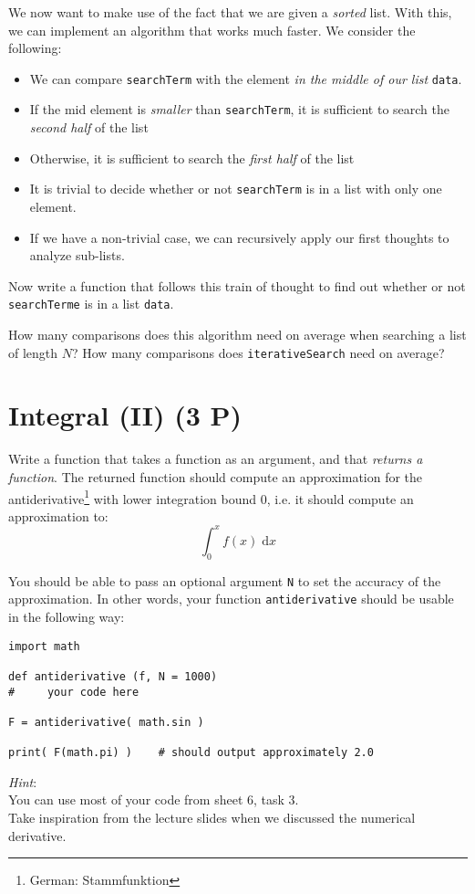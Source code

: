 \documentclass[
	ngerman,
	fontsize=10pt,
	parskip=half,
	titlepage=true,
	DIV=12
]{scrartcl}
\newcommand*{\ie}{i.\;e. }
\begin{document}
We now want to make use of the fact that we are given a \emph{sorted} list. With this, we can implement an algorithm that works much faster. We consider the following:
\begin{itemize}
\item We can compare \texttt{searchTerm} with the element \emph{in the middle of our list} \texttt{data}.
\item If the mid element is \emph{smaller} than \texttt{searchTerm}, it is sufficient to search the \emph{second half} of the list
\item Otherwise, it is sufficient to search the \emph{first half} of the list
\item It is trivial to decide whether or not \texttt{searchTerm} is in a list with only one element.
\item If we have a non-trivial case, we can recursively apply our first thoughts to analyze sub-lists.
\end{itemize}

Now write a function that follows this train of thought to find out whether or not \texttt{searchTerme} is in a list \texttt{data}.

How many comparisons does this algorithm need on average when searching a list of length $N$? How many comparisons does \texttt{iterativeSearch} need on average?


\section{Integral (II) (3 P)}
Write a function that takes a function as an argument, and that \emph{returns a function}. The returned function should compute an approximation for the antiderivative\footnote{German: Stammfunktion} with lower integration bound 0, \ie it should compute an approximation to:
\[ \int_0^x f(x) \;\text{d}{x} \]

You should be able to pass an optional argument \texttt{N} to set the accuracy of the approximation.
In other words, your function \texttt{antiderivative} should be usable in the following way:

\begin{verbatim}
import math

def antiderivative (f, N = 1000)
#     your code here

F = antiderivative( math.sin )

print( F(math.pi) )    # should output approximately 2.0
\end{verbatim}

\emph{Hint}:\\
You can use most of your code from sheet 6, task 3.\\
Take inspiration from the lecture slides when we discussed the numerical derivative.
\end{document}
